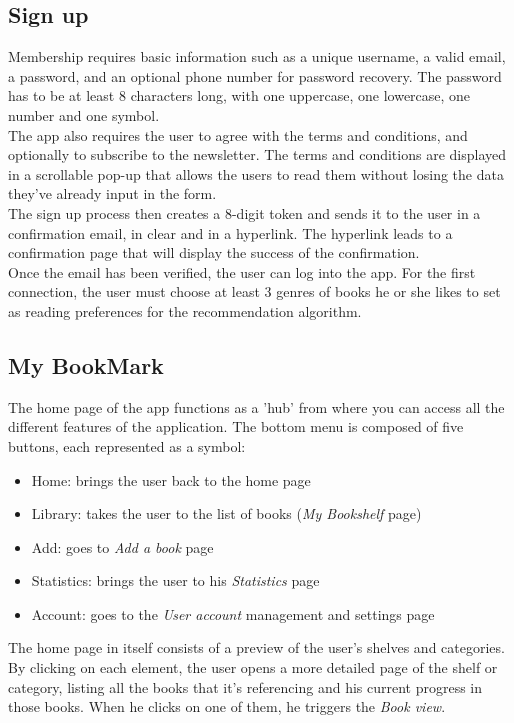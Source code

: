 \documentclass[conference]{IEEEtran}
\begin{document}
\subsection{Sign up}
Membership requires basic information such as a unique username, a valid email, a password, and an optional phone number for password recovery. The password has to be at least 8 characters long, with one uppercase, one lowercase, one number and one symbol.\\
The app also requires the user to agree with the terms and conditions, and optionally to subscribe to the newsletter. The terms and conditions are displayed in a scrollable pop-up that allows the users to read them without losing the data they've already input in the form.\\
The sign up process then creates a 8-digit token and sends it to the user in a confirmation email, in clear and in a hyperlink. The hyperlink leads to a confirmation page that will display the success of the confirmation.\\
Once the email has been verified, the user can log into the app. For the first connection, the user must choose at least 3 genres of books he or she likes to set as reading preferences for the recommendation algorithm.\\


\subsection{My BookMark}
The home page of the app functions as a 'hub' from where you can access all the different features of the application. The bottom menu is composed of five buttons, each represented as a symbol:
\begin{itemize}
	\item Home: brings the user back to the home page
	\item Library: takes the user to the list of books (\textit{My Bookshelf} page)
	\item Add: goes to \textit{Add a book} page
	\item Statistics: brings the user to his \textit{Statistics} page
	\item Account: goes to the \textit{User account} management and settings page
\end{itemize}

The home page in itself consists of a preview of the user's shelves and categories. By clicking on each element, the user opens a more detailed page of the shelf or category, listing all the books that it's referencing and his current progress in those books. When he clicks on one of them, he triggers the \textit{Book view}.\\
\end{document}
